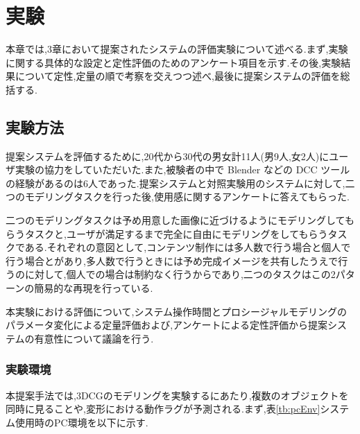 \newpage

\chapter{実験}

本章では,3章において提案されたシステムの評価実験について述べる.まず,実験に関する具体的な設定と定性評価のためのアンケート項目を示す.その後,実験結果について定性,定量の順で考察を交えつつ述べ,最後に提案システムの評価を総括する.

\section{実験方法}
提案システムを評価するために,20代から30代の男女計11人(男9人,女2人)にユーザ実験の協力をしていただいた.また,被験者の中で Blender などの DCC ツールの経験があるのは6人であった.提案システムと対照実験用のシステムに対して,二つのモデリングタスクを行った後,使用感に関するアンケートに答えてもらった.

二つのモデリングタスクは予め用意した画像に近づけるようにモデリングしてもらうタスクと,ユーザが満足するまで完全に自由にモデリングをしてもらうタスクである.それぞれの意図として,コンテンツ制作には多人数で行う場合と個人で行う場合とがあり,多人数で行うときには予め完成イメージを共有したうえで行うのに対して,個人での場合は制約なく行うからであり,二つのタスクはこの2パターンの簡易的な再現を行っている.

本実験における評価について,システム操作時間とプロシージャルモデリングのパラメータ変化による定量評価および,アンケートによる定性評価から提案システムの有意性について議論を行う.

\subsection{実験環境}
本提案手法では,3DCGのモデリングを実験するにあたり,複数のオブジェクトを同時に見ることや,変形における動作ラグが予測される.まず,表\ref{tb:pcEnv}システム使用時のPC環境を以下に示す.
\begin{table}[h]
	\centering
	\caption{PC 環境\label{tb:pcEnv}}
\end{table}
